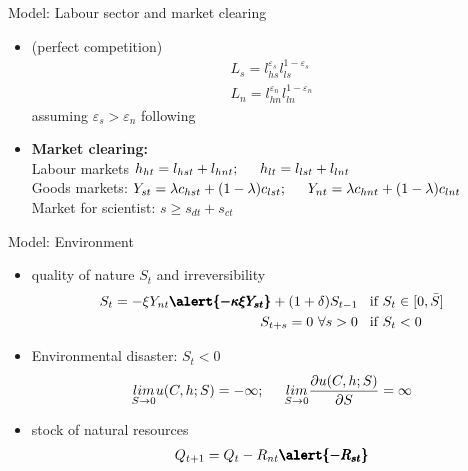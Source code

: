 \documentclass[11pt,aspectratio=169]{beamer}
\begin{document}
\begin{frame}{Model: Labour sector and market clearing}
	\begin{itemize}
\item \alert{} (perfect competition)
\begin{align*}
L_s= l_{hs}^{\varepsilon_s}l_{ls}^{1-\varepsilon_s}\\
L_n=l_{hn}^{\varepsilon_n}l_{ln}^{1-\varepsilon_n}
\end{align*}
assuming $\varepsilon_s>\varepsilon_n$ following \cite{Consoli2016DoCapital}
\vspace{3mm}
\item \textbf{Market clearing:}\\
{Labour markets} \hspace{12mm}
$ h_{ht}= l_{hst}+l_{hnt}; \  \hspace{4mm}
  h_{lt}= l_{lst}+l_{lnt}$
\\ {Goods markets}: \hspace{11mm} 
$Y_{st}=\lambda c_{hst}+(1-\lambda)c_{lst}; \ \hspace{4mm} Y_{nt}=\lambda c_{hnt}+(1-\lambda)c_{lnt}$
\\
Market for scientist: \hspace{4mm} $s\geq s_{dt}+s_{ct}$
	\end{itemize}
\end{frame}

\begin{frame}{Model: Environment}
\begin{itemize}
\item quality of nature $S_t$ and irreversibility
\begin{align*}
S_{t}= -\xi Y_{nt}\pmb{\alert{-\kappa \xi Y_{st}}}+(1+\delta)S_{t-1} & \hspace{3mm} \text{if}\  S_{t}\in[0,\bar{S}]\\
S_{t+s}=0 \ \forall s>0& \hspace{3mm}  \text{if} \ S_{t}<0
\end{align*}
\item Environmental disaster: $S_t<0$
\begin{align*}
\underset{S\rightarrow0}{lim} u(C,h;S)=-\infty; 
\hspace{5mm} 
\underset{S\rightarrow0}{lim}\frac{\partial u(C,h;S)}{\partial S}=\infty
\end{align*}
\item stock of natural resources
\begin{align*}
Q_{t+1}=Q_t-R_{nt}\pmb{\alert{-R_{st}}}
\end{align*}
\end{itemize}
\end{frame}
\end{document}

